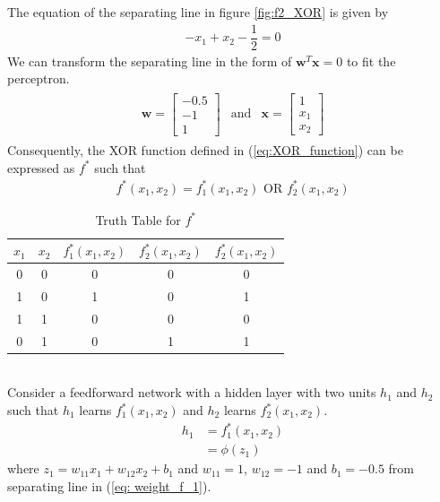The equation of the separating line in figure \ref{fig:f2_XOR} is given by
\begin{align}
  -x_1 + x_2 - \dfrac{1}{2} = 0
\end{align}
We can transform the separating line in the form of $\textbf{w}^T\textbf{x} = 0$ to fit the perceptron.
\begin{align}
  \label{eq: weight_f_2}
  \begin{matrix}
    \textbf{w} = \begin{bmatrix}
      -0.5 \\
      -1 \\
      1
    \end{bmatrix} & \text{and} & \textbf{x} = \begin{bmatrix}
      1 \\
      x_1 \\
      x_2
    \end{bmatrix}
  \end{matrix}
\end{align}
Consequently, the XOR function defined in (\ref{eq:XOR_function}) can be expressed as $f^*$ such that
\begin{align}
  \nonumber
  f^*(x_1,x_2) = f_1^*(x_1,x_2) \text{ OR } f_2^*(x_1,x_2)
\end{align}
\begin{table}
  \begin{center}
    \begin{tabular}{ c c c c c}
      $x_1$ & $x_2$ & $f_1^*(x_1,x_2)$ & $f_2^*(x_1,x_2)$ &$f_2^*(x_1,x_2)$ \\
     \hline 
      0 & 0 & 0 & 0 & 0\\  
      1 & 0 & 1 & 0 & 1\\  
      1 & 1 & 0 & 0 & 0\\  
      0 & 1 & 0 & 1 & 1
    \end{tabular}
    \caption{Truth Table for $f^{*}$}
  \label{table:truth_table_f*}
  \end{center}  
\end{table}\vspace{20mm}\\
Consider a feedforward network with a hidden layer with two units $h_1$ and $h_2$ such that $h_1$ learns $f_1^*(x_1,x_2)$ and $h_2$ learns $f_2^*(x_1,x_2)$.
\begin{align}
  h_1 &= f_1^*(x_1,x_2) \nonumber\\
  &= \phi(z_1) \nonumber
\end{align}
where $z_1 = w_{11}x_1 + w_{12}x_2 + b_1$ and $w_{11} = 1$, $w_{12} = -1$ and $b_1=-0.5$ from separating line in (\ref{eq: weight_f_1}).

